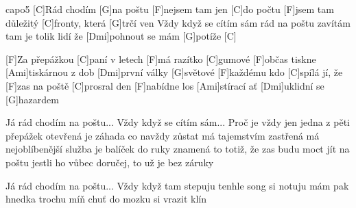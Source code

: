 \hfill capo5
[C]Rád chodím [G]na poštu
[F]nejsem tam jen [C]do počtu
[F]jsem tam důležitý [C]fronty, která [G]trčí ven
Vždy když se cítím sám
rád na poštu zavítám
tam je tolik lidí že
[Dmi]pohnout se mám [G]potíže [C]

[F]Za přepážkou [C]paní v letech [F]má razítko [C]gumové
[F]občas tiskne [Ami]tiskárnou z dob [Dmi]první války [G]světové
[F]každému kdo [C]spílá jí, že [F]zas na poště [C]prosral den
[F]nabídne los [Ami]stírací ať [Dmi]uklidní se [G]hazardem

Já rád chodím na poštu...
Vždy když se cítím sám...
Proč je vždy jen jedna z pěti přepážek otevřená
je záhada co navždy zůstat má tajemstvím zastřená
má nejoblíbenější služba je balíček do ruky
znamená to totiž, že zas budu moct jít na poštu
jestli ho vůbec doručej, to už je bez záruky

Já rád chodím na poštu...
Vždy když tam stepuju
tenhle song si notuju
mám pak hnedka trochu míň
chuť do mozku si vrazit klín
\columnbreak